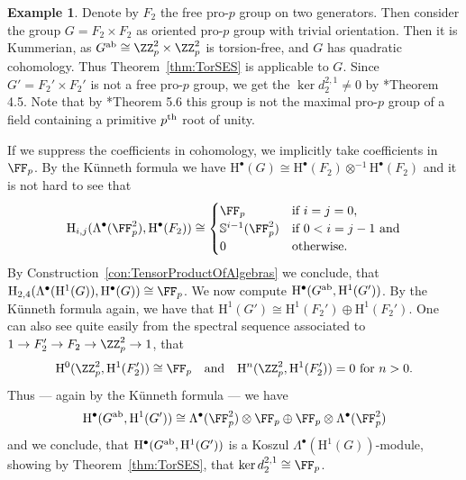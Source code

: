 \documentclass{amsart}
\theoremstyle{definition}
\newtheorem{exmp}[thm]{Example}
\theoremstyle{remark}
\newcommand{\rmH}{\mathrm{H}}
\numberwithin{equation}{section}
\begin{document}
\begin{exmp}
\label{exmp:F2 times F2}
    Denote by $F_2$ the free pro-$p$ group on two generators. Then consider the group $G=F_2\times F_2$ as oriented pro-$p$ group with trivial orientation. Then it is Kummerian, as $G^{\rm ab}\cong \ZZ_p^2\times \ZZ_p^2$ is torsion-free, and $G$ has quadratic cohomology. Thus Theorem~\ref{thm:TorSES} is applicable to $G$. Since $G'=F_2'\times F_2'$ is not a free pro-$p$ group, we get the $\ker d_2^{2,1}\neq 0$ by \cite{QuadrelliWeigel2022}*{Theorem 4.5}. Note that by \cite{Quadrelli2014}*{Theorem 5.6} this group is not the maximal pro-$p$ group of a field containing a primitive $p^{\rm th}$ root of unity. 

    If we suppress the coefficients in cohomology, we implicitly take coefficients in $\FF_p$. By the Künneth formula we have $\rmH^\bullet(G)\cong \rmH^\bullet(F_2)\otimes^{-1}\rmH^\bullet(F_2)$ and it is not hard to see that 
    \begin{align*}
        \rmH_{i,j}(\Lambda^\bullet(\FF_p^2),\rmH^\bullet(F_2))\cong \begin{cases}
            \FF_p&\text{if }i=j=0,\\
            \mathbb{S}^{i-1}(\FF_p^2)&\text{if }0<i=j-1\text{ and}\\
            0&\text{otherwise.}
        \end{cases}
    \end{align*}
    By Construction~\ref{con:TensorProductOfAlgebras} we conclude, that $\rmH_{2,4}(\Lambda^\bullet(\rmH^1(G)),\rmH^\bullet(G))\cong \FF_p$. We now compute $\rmH^\bullet(G^{\rm ab},\rmH^1(G'))$. By the Künneth formula again, we have that $\rmH^1(G')\cong \rmH^1(F_2')\oplus \rmH^1(F_2')$. One can also see quite easily from the spectral sequence associated to $1\to F_2'\to F_2\to \ZZ_p^2\to 1$, that
    \begin{align*}
        \rmH^0(\ZZ_p^2,\rmH^1(F_2'))\cong \FF_p\quad \text{and}\quad \rmH^n(\ZZ_p^2,\rmH^1(F_2'))=0\text{ for }n>0.
    \end{align*}
    Thus --- again by the Künneth formula --- we have
    \begin{align*}
        \rmH^\bullet(G^{\rm ab},\rmH^1(G'))\cong \Lambda^\bullet(\FF_p^2)\otimes \FF_p\oplus \FF_p\otimes \Lambda^\bullet(\FF_p^2)
    \end{align*}
    and we conclude, that $\rmH^\bullet(G^{\rm ab},\rmH^1(G'))$ is a Koszul $\Lambda^\bullet(\rmH^1(G))$-module, showing by Theorem~\ref{thm:TorSES}, that $\ker d^{2,1}_2\cong \FF_p$.
\end{exmp}
\end{document}
